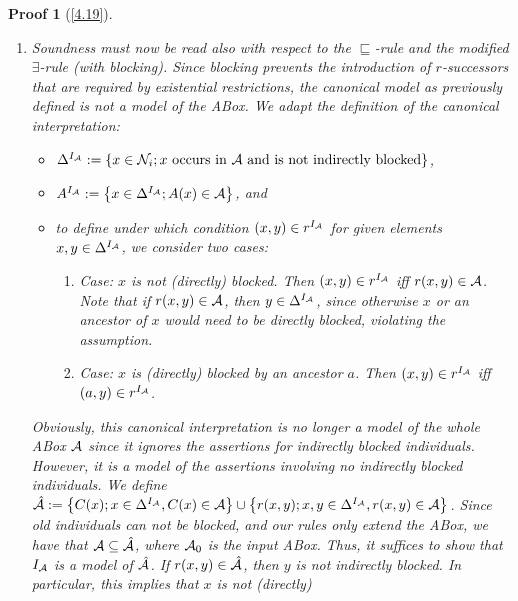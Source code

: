 \documentclass[openany]{scrbook}
\theoremstyle{break}
\theoremstyle{nonumberbreak}
\theoremstyle{nonumberplain}
\theoremstyle{nonumberbreak}
\newtheorem{Proof}{Proof}
\newcommand{\set}[1]{\left\{#1\right\}}
\begin{document}
\begin{Proof}[\cref{4.19}]
  \begin{enumerate}
  \item Soundness must now be read also with respect to the
    $\sqsubseteq$-rule and the modified $\exists$-rule (with
    blocking). Since blocking prevents the introduction of
    $r$-successors that are required by existential restrictions, the
    canonical model as previously defined is not a model of the
    ABox. We adapt the definition of the canonical interpretation:
    \begin{itemize}
    \item $\Delta^{I_{\cal A}} := \set{x \in {\cal N}_i; x\
        \text{occurs in}\ {\cal A}\ \text{and is not indirectly
          blocked}}$,
    \item $A^{I_{\cal A}} := \set{x \in \Delta^{I_{\cal A}}; A(x) \in
        {\cal A}}$, and
    \item to define under which condition $(x, y) \in r^{I_{\cal A}}$
      for given elements $x, y \in \Delta^{I_{\cal A}}$, we consider
      two cases:
      \begin{enumerate}
      \item Case: $x$ is not (directly) blocked. Then $(x, y) \in
        r^{I_{\cal A}}$ iff $r(x, y) \in {\cal A}$. Note that if $r(x,
        y) \in {\cal A}$, then $y \in \Delta^{I_{\cal A}}$, since
        otherwise $x$ or an ancestor of $x$ would need to be directly
        blocked, violating the assumption.
      \item Case: $x$ is (directly) blocked by an ancestor $a$. Then
        $(x, y) \in r^{I_{\cal A}}$ iff $(a, y) \in r^{I_{\cal A}}$.
      \end{enumerate}
    \end{itemize}
    Obviously, this canonical interpretation is no longer a model of
    the whole ABox ${\cal A}$ since it ignores the assertions for
    indirectly blocked individuals. However, it is a model of the
    assertions involving no indirectly blocked individuals. We define
    $\hat{\cal A} := \set{C(x); x \in \Delta^{I_{\cal A}}, C(x) \in
      {\cal A}} \cup \set{r(x, y); x, y \in \Delta^{I_{\cal A}}, r(x,
      y) \in {\cal A}}$. Since old individuals can not be blocked, and
    our rules only extend the ABox, we have that ${\cal A} \subseteq
    \hat{\cal A}$, where ${\cal A}_0$ is the input ABox. Thus, it
    suffices to show that $I_{\cal A}$ is a model of $\hat{\cal
      A}$. If $r(x, y) \in \hat{\cal A}$, then $y$ is not indirectly
    blocked. In particular, this implies that $x$ is not (directly)

\end{enumerate}
\end{Proof}
\end{document}
